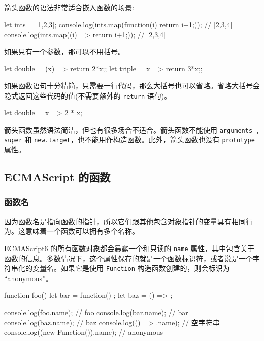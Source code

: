 箭头函数的语法非常适合嵌入函数的场景:

\begin{JavaScript}
let ints = [1,2,3];
console.log(ints.map(function(i) {return i+1;}));   // [2,3,4]
console.log(ints.map((i) => {return i+1;}));   // [2,3,4]
\end{JavaScript}

如果只有一个参数，那可以不用括号。

\begin{JavaScript}
let double = (x) => {return 2*x;};
let triple = x => {return 3*x;};
\end{JavaScript}

如果函数语句十分精简，只需要一行代码，那么大括号也可以省略。省略大括号会隐式返回这些代码的值(不需要额外的 \texttt{return} 语句)。

\begin{JavaScript}
let double = x => 2 * x;
\end{JavaScript}

箭头函数虽然语法简洁，但也有很多场合不适合。箭头函数不能使用 \texttt{arguments , super} 和 \texttt{new.target}，也不能用作构造函数。此外，箭头函数也没有 \texttt{prototype} 属性。

\subsection{ECMAScript 的函数}

\subsubsection*{函数名}

因为函数名是指向函数的指针，所以它们跟其他包含对象指针的变量具有相同行为。这意味着一个函数可以拥有多个名称。

ECMAScript6 的所有函数对象都会暴露一个和只读的 \texttt{name} 属性，其中包含关于函数的信息。多数情况下，这个属性保存的就是一个函数标识符，或者说是一个字符串化的变量名。如果它是使用 \texttt{Function} 构造函数创建的，则会标识为 ``anonymous''。

\begin{JavaScript}
function foo() {}
let bar = function() {};
let baz = () => {};

console.log(foo.name);      // foo
console.log(bar.name);      // bar
console.log(baz.name);      // baz
console.log(() => {}.name);      // 空字符串
console.log((new Function()).name);      // anonymous
\end{JavaScript}

